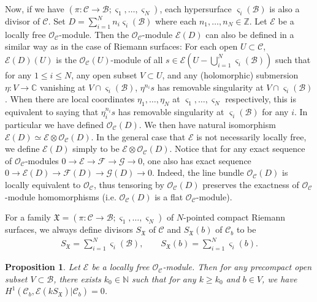 \documentclass[12pt,b5paper,notitlepage]{report}
\theoremstyle{definition}
\theoremstyle{plain}
\newtheorem{pp}[df]{Proposition}
\newcommand{\fk}{\mathfrak}
\newcommand{\mc}{\mathcal}
\newcommand{\scr}{\mathscr}
\newcommand{\sgm}{\varsigma}
\newcommand{\SX}{S_{\fk X}}
\newcommand{\Nbb}{\mathbb N}
\numberwithin{equation}{section}
\begin{document}
Now, if we have $(\pi:\mc C\rightarrow\mc B;\sgm_1,\dots,\sgm_N)$, each hypersurface $\sgm_i(\mc B)$ is also a divisor of $\mc C$. Set $D=\sum_{i=1}^Nn_i\sgm_i(\mc B)$ where each $n_1,\dots,n_N\in\mathbb Z$. Let $\scr E$ be a locally free $\scr O_{\mc C}$-module. Then the $\scr O_{\mc C}$-module $\scr E(D)$ can also be defined in a similar way as in the case of Riemann surfaces: For each open $U\subset \mc C$, $\scr E(D)(U)$ is the $\scr O_{\mc C}(U)$-module of all $s\in\scr E(U-\bigcup_{i=1}^N\sgm_i(\mc B))$ such that for any $1\leq i\leq N$, any open subset $V\subset U$, and any (holomorphic) submersion $\eta:V\rightarrow \mathbb C$ vanishing at $V\cap\sgm_i(\mc B)$, $\eta^{n_i}s$ has removable singularity at $V\cap\sgm_i(\mc B)$. \index{ED@$\scr E(D),\scr O_C(D)$} When there are local coordinates $\eta_1,\dots,\eta_N$ at $\sgm_1,\dots,\sgm_N$ respectively, this is equivalent to saying that $\eta_i^{n_i}s$ has removable singularity at $\sgm_i(\mc B)$ for any $i$. In particular we have defined $\scr O_{\mc C}(D)$. We then have natural isomorphism $\scr E(D)\simeq\scr E\otimes\scr O_{\mc C}(D)$. In the general case that  $\scr E$ is not necessarily locally free, we define $\scr E(D)$ simply to be $\scr E\otimes\scr O_{\mc C}(D)$. Notice that for any exact sequence of $\scr O_{\mc C}$-modules $0\rightarrow\scr E\rightarrow\scr F\rightarrow\scr G\rightarrow 0$, one also has exact sequence $0\rightarrow\scr E(D)\rightarrow\scr F(D)\rightarrow\scr G(D)\rightarrow 0$. Indeed,  the line bundle $\scr O_{\mc C}(D)$ is locally equivalent to $\scr O_{\mc C}$, thus tensoring by $\scr O_{\mc C}(D)$ preserves the exactness of $\scr O_{\mc C}$-module homomorphisms (i.e. $\scr O_{\mc C}(D)$ is a flat $\scr O_{\mc C}$-module).

For a family $\fk X=(\pi:\mc C\rightarrow\mc B;\sgm_1,\dots,\sgm_N)$ of $N$-pointed compact Riemann surfaces, we always define divisors $\SX$ of $\mc C$ and $\SX(b)$ of $\mc C_b$ \index{SX@$\SX$, $\SX(b)$} to be
\begin{gather*}
\SX=\sum_{i=1}^N\sgm_i(\mc B),\qquad \SX(b)=\sum_{i=1}^N\sgm_i(b).
\end{gather*}


\begin{pp}\label{lb129}
Let $\scr E$ be a locally free $\scr O_{\mc C}$-module. Then for any precompact open subset $V\subset\mc B$, there exists $k_0\in\Nbb$ such that for any $k\geq k_0$ and $b\in V$, we have $H^1(\mc C_b,\scr E(k\SX)|\mc C_b)=0$.
\end{pp}
\end{document}
